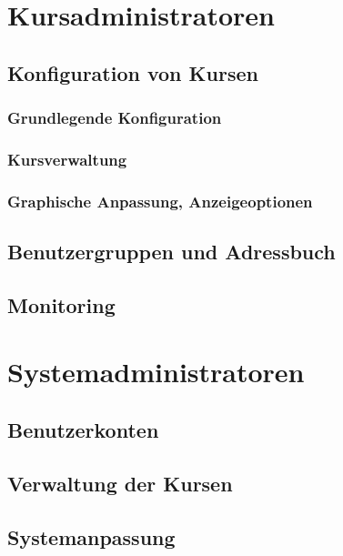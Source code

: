 \documentclass[a4paper]{scrreprt}
\begin{document}
	\section{Kursadministratoren}
		
        
		\subsection{Konfiguration von Kursen}
			\subsubsection{Grundlegende Konfiguration}
				
			\subsubsection{Kursverwaltung}
				
			\subsubsection{Graphische Anpassung, Anzeigeoptionen}
				
		\subsection{Benutzergruppen und Adressbuch}
			
			
		\subsection{Monitoring}
		
			

		
	
	\section{Systemadministratoren}
		
		
		\subsection{Benutzerkonten}
			
		\subsection{Verwaltung der Kursen}
			
			
		\subsection{Systemanpassung}
			
\end{document}
